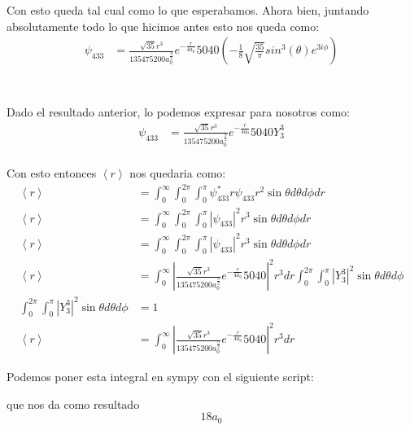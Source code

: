 \documentclass{report}
\begin{document}
Con esto queda tal cual como lo que esperabamos. Ahora bien, juntando absolutamente todo lo que hicimos antes esto nos queda como:
\begin{align*}
	\psi_{4 3 3} &= \frac{\sqrt{35} r^{3}}{135475200 a_{0}^{\frac{9}{2}}} e^{- \frac{r}{4 a_0}} 5040 \left(- \frac{1}{8}\sqrt{\frac{35}{\pi}} sin^{3}{\left(\theta \right)} e^{3 i \phi}\right)\\
\end{align*}

\section{}

Dado el resultado anterior, lo podemos expresar para nosotros como:
\begin{align*}
	\psi_{4 3 3} &= \frac{\sqrt{35} r^{3}}{135475200 a_{0}^{\frac{9}{2}}} e^{- \frac{r}{4 a_0}} 5040 Y_3^3 \\
\end{align*}

Con esto entonces $\left< r \right>$ nos quedaria como:
\begin{align*}
	\left< r \right> &= \int_0^\infty \int_0^{2\pi} \int_0^\pi \psi_{4 3 3}^* r \psi_{4 3 3} r^2 \sin\theta d\theta d\phi dr\\
	\left< r \right> &= \int_0^\infty \int_0^{2\pi} \int_0^\pi \left| \psi_{4 3 3}\right|^2 r^3 \sin\theta d\theta d\phi dr\\
	\left< r \right> &= \int_0^\infty \int_0^{2\pi} \int_0^\pi \left| \psi_{4 3 3}\right|^2 r^3 \sin\theta d\theta d\phi dr\\
	\left< r \right> &= \int_0^\infty \left|\frac{\sqrt{35} r^{3}}{135475200 a_{0}^{\frac{9}{2}}} e^{- \frac{r}{4 a_0}} 5040\right|^2 r^3 dr \int_0^{2\pi} \int_0^\pi \left| Y_{3}^3 \right|^2 \sin\theta d\theta d\phi\\
	\int_0^{2\pi} \int_0^\pi \left| Y_{3}^3 \right|^2 \sin\theta d\theta d\phi &= 1\\
	\left< r \right> &= \int_0^\infty \left|\frac{\sqrt{35} r^{3}}{135475200 a_{0}^{\frac{9}{2}}} e^{- \frac{r}{4 a_0}} 5040 \right|^2 r^3 dr
\end{align*}

Podemos poner esta integral en sympy con el siguiente script:


que nos da como resultado \[
	18 a_{0}
\]

\section{}
\end{document}
